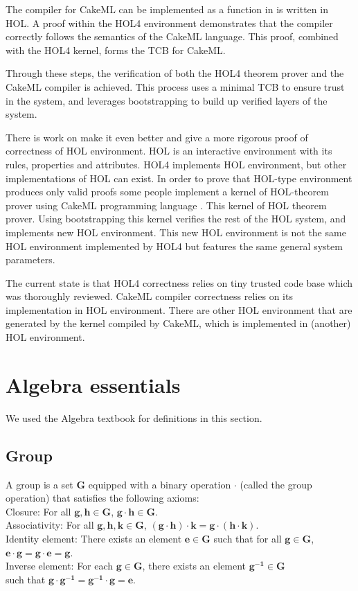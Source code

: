 The compiler for CakeML can be implemented as a function in is written in HOL. A proof within the HOL4 environment demonstrates that the compiler correctly follows the semantics of the CakeML language. This proof, combined with the HOL4 kernel, forms the TCB for CakeML.

Through these steps, the verification of both the HOL4 theorem prover and the CakeML compiler is achieved. This process uses a minimal TCB to ensure trust in the system, and leverages bootstrapping to build up verified layers of the system.

There is work on make it even better and give a more rigorous proof of correctness of HOL environment.
HOL is an interactive environment with its rules, properties and attributes. HOL4 implements HOL environment, but other implementations of HOL can exist. In order to prove that HOL-type environment produces only valid proofs some people implement a kernel of HOL-theorem prover using CakeML programming language \cite{Abrahamsson2022CandleAV, Kumar2014HOLWD}. This kernel of HOL theorem prover. Using bootstrapping this kernel verifies the rest of the HOL system, and implements new HOL environment. This new HOL environment is not the same HOL environment implemented by HOL4 but features the same general system parameters. 

The current state is that HOL4 correctness relies on tiny trusted code base which was thoroughly reviewed. CakeML compiler correctness relies on its implementation in HOL environment. 
There are other HOL environment that are generated by the kernel compiled by CakeML, which is implemented in (another) HOL environment. 

\section{Algebra essentials}
We used the Algebra textbook for definitions in this section\cite{Artin:1998}.

\subsection{Group}
A group is a set $\mathbf{G}$ equipped with a binary operation $\cdot$ (called the group operation) that satisfies the following axioms: \\
Closure: For all $\mathbf{g,h} \in \mathbf{G}$, $\mathbf{g} \cdot \mathbf{h} \in \mathbf{G}$. \\ 
Associativity: For all $\mathbf{g,h,k} \in \mathbf{G}$, $(\mathbf{g} \cdot \mathbf{h}) \cdot \mathbf{k} = \mathbf{g} \cdot (\mathbf{h} \cdot \mathbf{k})$. \\ 
Identity element: There exists an element $\mathbf{e} \in \mathbf{G}$ such that for all $\mathbf{g} \in \mathbf{G}$, $\mathbf{e} \cdot \mathbf{g} = \mathbf{g} \cdot \mathbf{e} = \mathbf{g}$. \\ 
Inverse element: For each $\mathbf{g} \in \mathbf{G}$, there exists an element $\mathbf{g^{-1}} \in \mathbf{G}$ \\ 
such that $\mathbf{g} \cdot \mathbf{g^{-1}} = \mathbf{g^{-1}} \cdot \mathbf{g} = \mathbf{e}$. 

